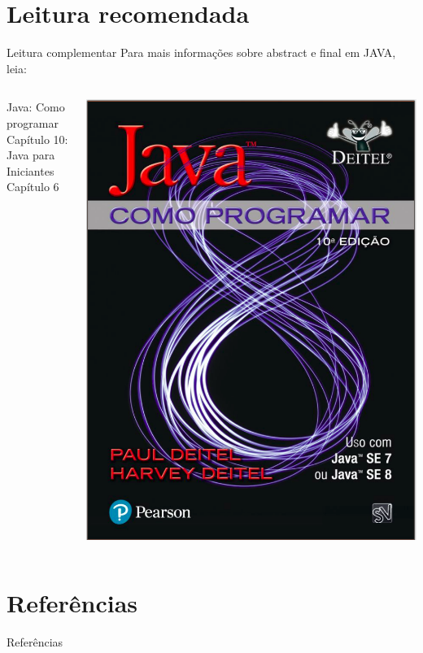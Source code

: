 \documentclass[11pt,aspectratio=43,ignorenonframetext,t]{beamer}
\begin{document}
\section{Leitura recomendada}
\begin{frame}{Leitura complementar}
 Para mais informações sobre abstract e final em JAVA, leia:\\
 \begin{columns}
   \begin{column}{0.4\textwidth}
     Java: Como programar\\
     Capítulo 10: \cite{deitel2010java}\\
     \vspace{0.3cm}
      Java para Iniciantes\\
      Capítulo 6
      \cite{schildt2015java}
   \end{column}
   \begin{column}{0.3\textwidth}
    \begin{center}
  \includegraphics[height=0.5\paperheight]{fig/aula1/deitel2017java.png} \\
 \end{center}
   \end{column}
 \end{columns}
\end{frame}
\section{Referências}

\begin{frame}{Referências}%
\small
\begin{center}
\tiny


\end{center}
\end{frame}
\setcounter{framenumber}{\thelastpagemainpart}
\end{document}
